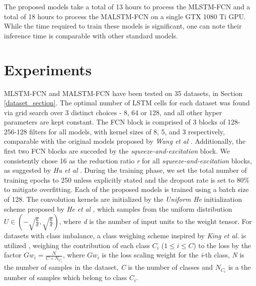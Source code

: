 \documentclass[preprint,12pt,3p]{elsarticle}
\begin{document}
The proposed models take a total of 13 hours to process the MLSTM-FCN and a total of 18 hours to process the MALSTM-FCN on a single GTX 1080 Ti GPU. While the time required to train these models is significant, one can note their inference time is comparable with other standard models.








%
 


\section{Experiments}
\label{Experiments}
MLSTM-FCN and MALSTM-FCN have been tested on 35 datasets, in Section \ref{dataset_section}. The optimal number of LSTM cells for each dataset was found via grid search over 3 distinct choices - 8, 64 or 128, and all other hyper parameters are kept constant. The FCN block is comprised of 3 blocks of 128-256-128 filters for all models, with kernel sizes of 8, 5, and 3 respectively, comparable with the original models proposed by \textit{Wang et al} \cite{wang2017time}. Additionally, the first two FCN blocks are succeded by the \textit{squeeze-and-excitation} block. We consistently chose 16 as the reduction ratio \textit{r} for all \textit{squeeze-and-excitation} blocks, as suggested by \textit{Hu et al} \cite{hu2017squeeze}. During the training phase, we set the total number of training epochs to 250 unless explicitly stated and the dropout rate is set to 80\% to mitigate overfitting. Each of the proposed models is trained using a batch size of 128. The convolution kernels are initialized by the \textit{Uniform He} initialization scheme proposed by \textit{He et al} \cite{he2015delving}, which samples from the uniform distribution $U \in \left (-\sqrt{\frac{6}{d}}, \sqrt{\frac{6}{d}} \right )$, where \textit{d} is the number of input units to the weight tensor.  For datasets with class imbalance, a class weighing scheme inspired by \textit{King et al.} is utilized \cite{king2001logistic}, weighing the contribution of each class $C_i$ ($1 \leq i \leq C$) to the loss by the factor $Gw_i = \frac{N}{C \times N_{C_i}}$, where $Gw_i$ is the loss scaling weight for the \textit{i}-th class, \textit{N} is the number of samples in the dataset, \textit{C} is the number of classes and $N_{C_i}$ is a the number of samples which belong to class $C_i$. 
\end{document}
